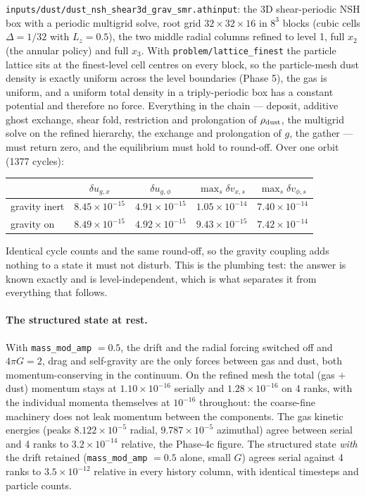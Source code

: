 \documentclass[11pt]{article}
\newcommand{\code}[1]{\texttt{#1}}
\newcommand{\file}[1]{\texttt{#1}}
\begin{document}
\file{inputs/dust/dust\_nsh\_shear3d\_grav\_smr.athinput}: the 3D shear-periodic NSH box
with a periodic multigrid solve, root grid $32\times32\times16$ in $8^3$ blocks (cubic
cells $\Delta = 1/32$ with $L_z = 0.5$), the two middle radial columns refined to level 1,
full $x_2$ (the annular policy) and full $x_3$. With \code{problem/lattice\_finest} the
particle lattice sits at the finest-level cell centres on every block, so the
particle-mesh dust density is exactly uniform across the level boundaries (Phase 5), the
gas is uniform, and a uniform total density in a triply-periodic box has a constant
potential and therefore no force. Everything in the chain --- deposit, additive ghost
exchange, shear fold, restriction and prolongation of $\rho_{\rm dust}$, the multigrid
solve on the refined hierarchy, the exchange and prolongation of $g$, the gather --- must
return zero, and the equilibrium must hold to round-off. Over one orbit (1377 cycles):

\begin{center}
\small
\begin{tabular}{@{}lcccc@{}}
\toprule
 & $\delta u_{g,x}$ & $\delta u_{g,\phi}$ & $\max_s \delta v_{x,s}$ & $\max_s \delta v_{\phi,s}$ \\
\midrule
gravity inert & $8.45\times10^{-15}$ & $4.91\times10^{-15}$ & $1.05\times10^{-14}$ & $7.40\times10^{-14}$ \\
gravity on    & $8.49\times10^{-15}$ & $4.92\times10^{-15}$ & $9.43\times10^{-15}$ & $7.42\times10^{-14}$ \\
\bottomrule
\end{tabular}
\end{center}

Identical cycle counts and the same round-off, so the gravity coupling adds nothing to a
state it must not disturb. This is the plumbing test: the answer is known exactly and is
level-independent, which is what separates it from everything that follows.

\paragraph{The structured state at rest.} With \code{mass\_mod\_amp} $= 0.5$, the drift
and the radial forcing switched off and $4\pi G = 2$, drag and self-gravity are the only
forces between gas and dust, both momentum-conserving in the continuum. On the refined
mesh the total (gas $+$ dust) momentum stays at $1.10\times10^{-16}$ serially and
$1.28\times10^{-16}$ on 4 ranks, with the individual momenta themselves at $10^{-16}$
throughout: the coarse-fine machinery does not leak momentum between the components. The
gas kinetic energies (peaks $8.122\times10^{-5}$ radial, $9.787\times10^{-5}$ azimuthal)
agree between serial and 4 ranks to $3.2\times10^{-14}$ relative, the Phase-4c figure. The
structured state \emph{with} the drift retained (\code{mass\_mod\_amp} $= 0.5$ alone,
small $G$) agrees serial against 4 ranks to $3.5\times10^{-12}$ relative in every history
column, with identical timesteps and particle counts.
\end{document}
